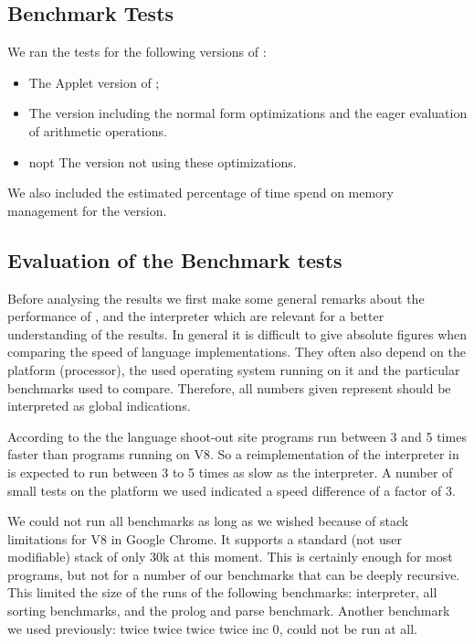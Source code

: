 \subsection{Benchmark Tests}
We ran the tests for the following versions of \Sapl: 
\begin{itemize}
\item{\Sapl} The \Java Applet version of \Sapl;
\item{\Sapljs} The \Sapljs version including the normal form optimizations and the eager evaluation of arithmetic operations. 
\item{\Sapljs nopt} The version not using these optimizations.
\end{itemize}
We also  included the estimated percentage of time spend on memory management for the \Sapljs version.

%

\subsection{Evaluation of the Benchmark tests}
Before analysing the results we first make some general remarks about the performance of \Java, \JS and the \Sapl interpreter which are relevant for
a better understanding of the results. In general it is difficult to give absolute figures when comparing the speed of language implementations. 
They often also depend on the platform (processor), the used operating system running on it and the particular benchmarks used to compare. 
Therefore, all numbers given represent should be interpreted as global indications. 

According to the the language shoot-out site \cite{SHOOTOUT} \Java 
programs run between 3 and 5 times faster than \JS programs running on V8. 
So a reimplementation of the \Sapl interpreter in \JS is expected to run between 3 to 5 times as slow as the \Sapl interpreter.
A number of small tests on the platform we used indicated a speed difference of a factor of 3.

We could not run all benchmarks as long as we wished because of stack limitations for V8 \JS in Google Chrome. 
It supports a standard (not user modifiable) stack of only 30k at this moment.
This is certainly enough for most \JS programs, but not for a number of our benchmarks that can be deeply recursive. 
This limited the size of the runs of the following benchmarks: interpreter, all sorting benchmarks, and the prolog and parse benchmark. 
Another benchmark we used previously: \textsf{twice twice twice twice inc 0}, could not be run at all.

